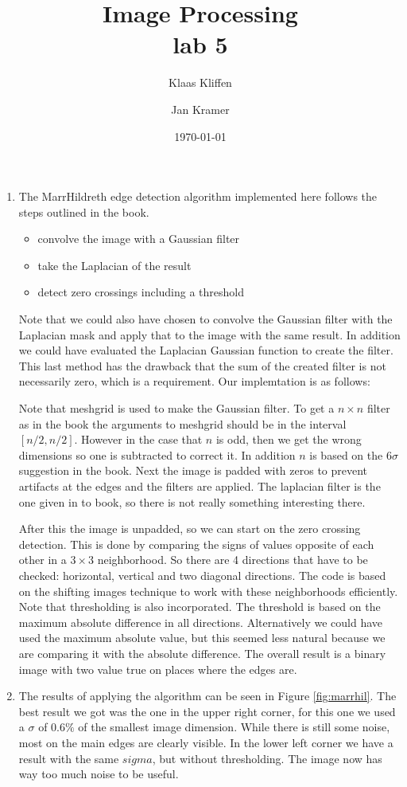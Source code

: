 \documentclass[a4paper]{article}
\title{\textsf{Image Processing \\ lab 5}}
\author{Klaas Kliffen \and Jan Kramer}
\date{\today}
\newcounter{exerciseCount}
\newcommand{\exercise}[1]{\addtocounter{exerciseCount}{1} \noindent \medskip {\large \textsf{\textbf{Exercise \arabic{exerciseCount} \--- #1}}} \par}
\begin{document}
\maketitle

\exercise{Edge detection}
\begin{enumerate}
\item
    The MarrHildreth edge detection algorithm implemented here follows the steps outlined in the book.
    \begin{itemize}
        \item convolve the image with a Gaussian filter
        \item take the Laplacian of the result
        \item detect zero crossings including a threshold
    \end{itemize}
    Note that we could also have chosen to convolve the Gaussian filter with the Laplacian mask and apply that to the image with the same result.
    In addition we could have evaluated the Laplacian Gaussian function to create the filter.
    This last method has the drawback that the sum of the created filter is not necessarily zero, which is a requirement.
    Our implemtation is as follows:

    Note that meshgrid is used to make the Gaussian filter.
    To get a $n\times n$ filter as in the book the arguments to meshgrid should be in the interval $[n/2, n/2]$.
    However in the case that $n$ is odd, then we get the wrong dimensions so one is subtracted to correct it.
    In addition $n$ is based on the $6\sigma$ suggestion in the book.
    Next the image is padded with zeros to prevent artifacts at the edges and the filters are applied.
    The laplacian filter is the one given in to book, so there is not really something interesting there.

    After this the image is unpadded, so we can start on the zero crossing detection.
    This is done by comparing the signs of values opposite of each other in a $3\times 3$ neighborhood.
    So there are 4 directions that have to be checked: horizontal, vertical and two diagonal directions.
    The code is based on the shifting images technique to work with these neighborhoods efficiently.
    Note that thresholding is also incorporated.
    The threshold is based on the maximum absolute difference in all directions.
    Alternatively we could have used the maximum absolute value, but this seemed less natural because we are comparing it with the absolute difference.
    The overall result is a binary image with two value true on places where the edges are.
\item
    The results of applying the algorithm can be seen in Figure \ref{fig:marrhil}.
    The best result we got was the one in the upper right corner, for this one we used a $\sigma$ of $0.6\%$ of the smallest image dimension.
    While there is still some noise, most on the main edges are clearly visible.
    In the lower left corner we have a result with the same $sigma$, but without thresholding.
    The image now has way too much noise to be useful.


\end{enumerate}
\end{document}
